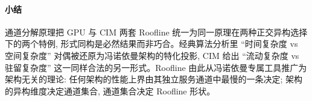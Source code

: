 \paragraph{小结}
通道分解原理把 GPU 与 CIM 两套 Roofline 统一为同一原理在两种正交异构选择下的两个特例, 形式同构是必然结果而非巧合。经典算法分析里 “时间复杂度 vs 空间复杂度” 对偶被还原为冯诺依曼架构的特化投影, CIM 给出 “流动复杂度 vs 驻留复杂度” 这一同样合法的另一形式。Roofline 由此从冯诺依曼专属工具推广为架构无关的理论: 任何架构的性能上界由其独立服务通道中最慢的一条决定; 架构的异构维度决定通道集合, 通道集合决定 Roofline 形状。
\newpage

